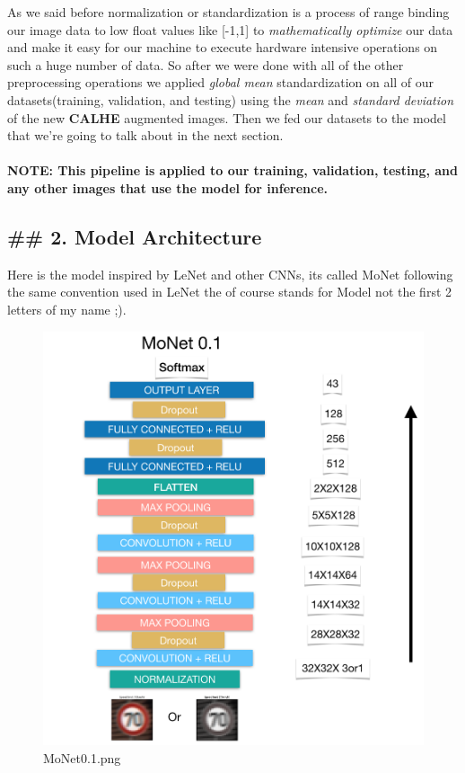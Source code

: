 \documentclass[11pt]{article}
\makeatletter
\def\maxwidth{\ifdim\Gin@nat@width>\linewidth\linewidth
    \else\Gin@nat@width\fi}
\let\Oldincludegraphics\includegraphics
\renewcommand{\includegraphics}[1]{\Oldincludegraphics[width=.8\maxwidth]{#1}}
\makeatother
\begin{document}
As we said before normalization or standardization is a process of range
binding our image data to low float values like {[}-1,1{]} to
\emph{mathematically optimize} our data and make it easy for our machine
to execute hardware intensive operations on such a huge number of data.
So after we were done with all of the other preprocessing operations we
applied \emph{global mean} standardization on all of our
datasets(training, validation, and testing) using the \emph{mean} and
\emph{standard deviation} of the new \textbf{CALHE} augmented images.
Then we fed our datasets to the model that we're going to talk about in
the next section.

\hypertarget{note-this-pipeline-is-applied-to-our-training-validation-testing-and-any-other-images-that-use-the-model-for-inference.}{%
\paragraph{NOTE: This pipeline is applied to our training, validation,
testing, and any other images that use the model for
inference.}\label{note-this-pipeline-is-applied-to-our-training-validation-testing-and-any-other-images-that-use-the-model-for-inference.}}

    \hypertarget{model-architecture}{%
\subsection{\#\# 2. Model Architecture}\label{model-architecture}}

Here is the model inspired by LeNet and other CNNs, its called MoNet
following the same convention used in LeNet the of course stands for
Model not the first 2 letters of my name ;).

\begin{figure}
\centering
\includegraphics{./assets/MoNet_correct.png}
\caption{MoNet0.1.png}
\end{figure}
\end{document}
